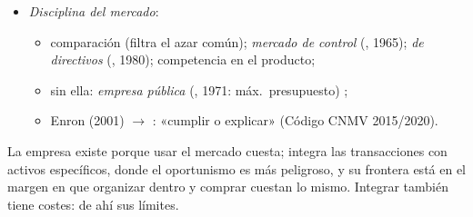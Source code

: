 \documentclass{article}
\begin{document}
\begin{columnas}
\begin{itemize}
\begin{itemize}
  \item Crecen con la separación y con los niveles: otro \emph{límite al tamaño}.
  \end{itemize}
\item \emph{Disciplina del mercado}:
  \begin{itemize}
  \item comparación (filtra el azar común); \emph{mercado de control} (, 1965); \emph{de directivos} (, 1980); competencia en el producto;
  \item sin ella: \emph{empresa pública} (, 1971: máx.\ presupuesto) ;
  \item Enron (2001) $\to$ : «cumplir o explicar» (Código CNMV 2015/2020).
  \end{itemize}
\end{itemize}

\begin{ideaclave}
La empresa existe porque usar el mercado cuesta; integra las transacciones con activos específicos, donde el oportunismo es más peligroso, y su frontera está en el margen en que organizar dentro y comprar cuestan lo mismo. Integrar también tiene costes: de ahí sus límites.
\end{ideaclave}


\end{columnas}
\end{document}
